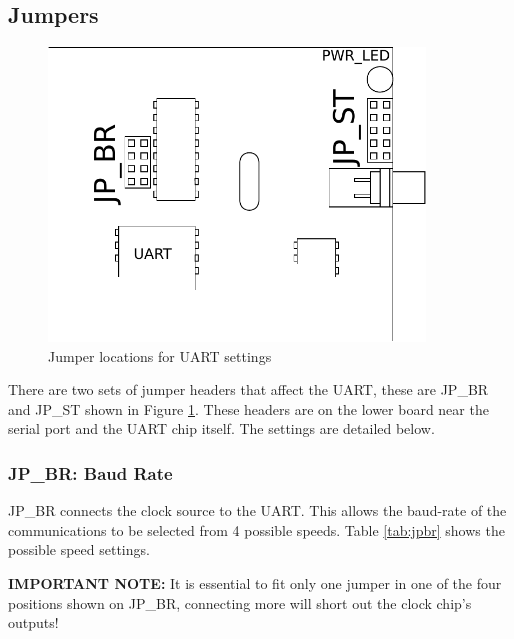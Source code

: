 \documentclass[a4paper,10pt]{book}
\begin{document}
\subsection{Jumpers}
\begin{figure}[h]
 \begin{center}
  \includegraphics[width=10cm]{uart_jumpers.pdf}
 \end{center}
 \caption{Jumper locations for UART settings}
 \label{fig:jumperlocations}
\end{figure}
There are two sets of jumper headers that affect the UART, these are JP\_BR and JP\_ST shown in Figure \ref{fig:jumperlocations}.  These headers are on the lower board near the serial port and the UART chip itself.  The settings are detailed below.
\subsubsection{JP\_BR: Baud Rate}
JP\_BR connects the clock source to the UART.  This allows the baud-rate of the communications to be selected from 4 possible speeds.  Table \ref{tab:jpbr} shows the possible speed settings.

\textbf{IMPORTANT NOTE:} It is essential to fit only one jumper in one of the four positions shown on JP\_BR, connecting more will short out the clock chip's outputs!
\end{document}
